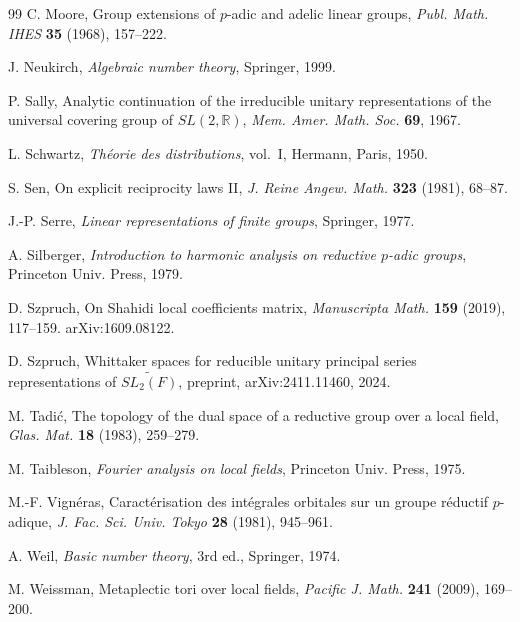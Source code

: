 \documentclass[12pt,letterpaper]{article}
\numberwithin{equation}{section}
\theoremstyle{definition}
\newcommand{\R}{\mathbb R}
\begin{document}
\begin{thebibliography}{99}
 C. Moore, Group extensions of $p$-adic and adelic linear groups,
\emph{Publ. Math. IHES} \textbf{35} (1968), 157--222.

 J. Neukirch, \emph{Algebraic number theory}, Springer, 1999.

 P. Sally, Analytic continuation of the irreducible unitary
representations of the universal covering group of $SL(2,\R)$, \emph{Mem. Amer. Math.
Soc.} \textbf{69}, 1967.

 L. Schwartz, \emph{Th\'eorie des distributions}, vol.~I, Hermann,
Paris, 1950.

 S. Sen, On explicit reciprocity laws II, \emph{J. Reine Angew. Math.}
\textbf{323} (1981), 68--87.

 J.-P. Serre, \emph{Linear representations of finite groups},
Springer, 1977.

 A. Silberger, \emph{Introduction to harmonic analysis on reductive
$p$-adic groups}, Princeton Univ. Press, 1979.

 D. Szpruch, On Shahidi local coefficients matrix, \emph{Manuscripta
Math.} \textbf{159} (2019), 117--159.  arXiv:1609.08122.

 D. Szpruch, Whittaker spaces for reducible unitary principal series
representations of $\widetilde{SL_2(F)}$, preprint, arXiv:2411.11460, 2024.

 M. Tadi\'c, The topology of the dual space of a reductive group over
a local field, \emph{Glas. Mat.} \textbf{18} (1983), 259--279.

 M. Taibleson, \emph{Fourier analysis on local fields}, Princeton
Univ. Press, 1975.

 M.-F. Vign\'eras, Caract\'erisation des int\'egrales orbitales sur un
groupe r\'eductif $p$-adique, \emph{J. Fac. Sci. Univ. Tokyo} \textbf{28} (1981),
945--961.

 A. Weil, \emph{Basic number theory}, 3rd ed., Springer, 1974.

 M. Weissman, Metaplectic tori over local fields, \emph{Pacific J.
Math.} \textbf{241} (2009), 169--200.

\end{thebibliography}
\end{document}
